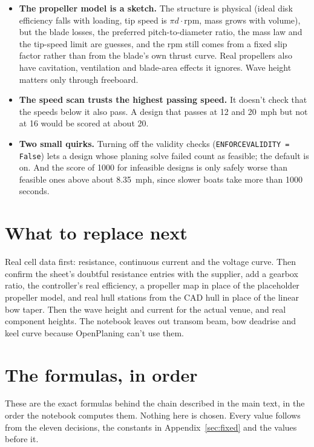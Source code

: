 \documentclass[11pt,a4paper]{article}
\renewcommand{\_}{\textunderscore\allowbreak}
\newcommand{\code}[1]{\texttt{#1}}
\begin{document}
\begin{itemize}
  \item \textbf{The propeller model is a sketch.} The structure is physical (ideal disk efficiency falls with loading, tip speed is $\pi d\cdot\mathrm{rpm}$, mass grows with volume), but the blade losses, the preferred pitch-to-diameter ratio, the mass law and the tip-speed limit are guesses,
        and the rpm still comes from a fixed slip factor rather than from the blade's own thrust curve. Real propellers also have cavitation, ventilation and blade-area effects it ignores. Wave height matters only through freeboard.
  \item \textbf{The speed scan trusts the highest passing speed.} It doesn't check that the speeds below it also pass. A design that passes at 12 and 20~mph but not at 16 would be scored at about 20.
  \item \textbf{Two small quirks.} Turning off the validity checks (\code{ENFORCE\_VALIDITY = False}) lets a design whose planing solve failed count as feasible; the default is on. And the score of 1000 for infeasible designs
        is only safely worse than feasible ones above about 8.35~mph, since slower boats take more than 1000 seconds.
\end{itemize}

\section*{What to replace next}

Real cell data first: resistance, continuous current and the voltage curve. Then confirm the sheet's doubtful resistance entries with the supplier, add a gearbox ratio, the controller's real efficiency, a propeller map in place of the placeholder propeller model, and real hull stations from the CAD hull in place of the linear bow taper. Then the wave height and current for the actual venue,
and real component heights. The notebook leaves out transom beam, bow deadrise and keel curve because OpenPlaning can't use them.

\appendix
\section{The formulas, in order}
\label{sec:calculated}

These are the exact formulas behind the chain described in the main text, in the order the notebook computes them. Nothing here is
chosen. Every value follows from the eleven decisions, the constants in Appendix~\ref{sec:fixed} and the values before it.
\end{document}
